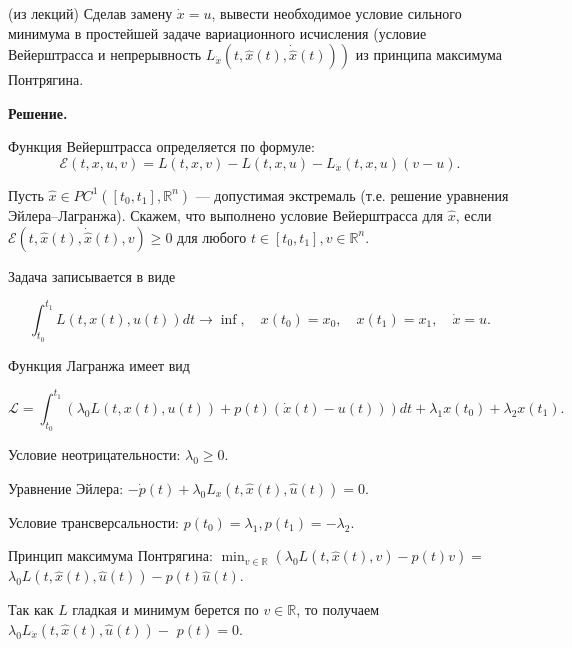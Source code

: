 \begin{task} 
    (из лекций) Сделав замену $\dot{x}=u$, вывести необходимое условие сильного минимума в простейшей задаче 
    вариационного исчисления 
    (условие Вейерштрасса и непрерывность $\left.L_{\dot{x}}(t, \hat{x}(t), \dot{\hat{x}}(t))\right)$ из принципа максимума Понтрягина.

    \textbf{Решение.} 
    
    \begin{definition}
        Функция Вейерштрасса определяется по формуле: 
        \begin{equation*}
             \mathcal{E}(t, x, u, v) = L(t, x, v) - L(t, x, u) - L_{\dot x}(t, x, u) (v - u). 
        \end{equation*}
    \end{definition}

    \begin{definition}
        Пусть $\widehat x \in PC^{1}([t_0, t_1], \mathbb{R}^n)$ --- допустимая экстремаль (т.е. решение уравнения Эйлера--Лагранжа). Скажем, 
        что выполнено условие Вейерштрасса для 
        $\widehat x$, 
        если $ \mathcal{E} (t, \widehat x(t), \dot{\widehat{x}} (t), v) \geq 0$ 
        для любого 
        $t \in [t_0, t_1], v \in \mathbb{R}^n $.
    \end{definition}

    
    Задача записывается в виде
    
    $$
    \int_{t_{0}}^{t_{1}} L(t, x(t), u(t)) d t \rightarrow \inf , \quad x\left(t_{0}\right)=x_{0}, \quad x\left(t_{1}\right)=x_{1}, \quad \dot{x}=u .
    $$
    
    Функция Лагранжа имеет вид
    
    $$
    \mathcal{L}=\int_{t_{0}}^{t_{1}}\left(\lambda_{0} L(t, x(t), u(t))+p(t)(\dot{x}(t)-u(t))\right) d t+\lambda_{1} x\left(t_{0}\right)+\lambda_{2} x\left(t_{1}\right) .
    $$
    
    Условие неотрицательности: $\lambda_{0} \geq 0$.
    
    Уравнение Эйлера: $-\dot{p}(t)+\lambda_{0} L_{x}(t, \hat{x}(t), \hat{u}(t))=0$.
    
    Условие трансверсальности: $p\left(t_{0}\right)=\lambda_{1}, p\left(t_{1}\right)=-\lambda_{2}$.
    
    Принцип максимума Понтрягина: $\min _{v \in \mathbb{R}}\left(\lambda_{0} L(t, \hat{x}(t), v)-p(t) v\right)=$ $\lambda_{0} L(t, \hat{x}(t), \hat{u}(t))-p(t) \hat{u}(t)$.
    
    Так как $L$ гладкая и минимум берется по $v \in \mathbb{R}$, то получаем $\lambda_{0} L_{\dot{x}}(t, \hat{x}(t), \hat{u}(t))-$ $p(t)=0$.
    

\end{task}
